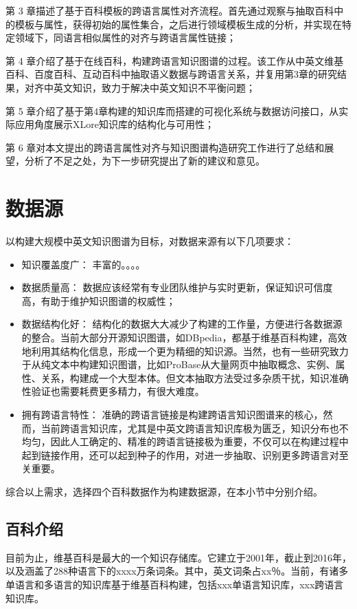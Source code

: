 第 3 章描述了基于百科模板的跨语言属性对齐流程。首先通过观察与抽取百科中的模板与属性，获得初始的属性集合，之后进行领域模板生成的分析，并实现在特定领域下，同语言相似属性的对齐与跨语言属性链接；

第 4 章介绍了基于在线百科，构建跨语言知识图谱的过程。该工作从中英文维基百科、百度百科、互动百科中抽取语义数据与跨语言关系，并复用第3章的研究结果，对齐中英文知识，致力于解决中英文知识不平衡问题；

第 5 章介绍了基于第4章构建的知识库而搭建的可视化系统与数据访问接口，从实际应用角度展示XLore知识库的结构化与可用性；

第 6 章对本文提出的跨语言属性对齐与知识图谱构造研究工作进行了总结和展望，分析了不足之处，为下一步研究提出了新的建议和意见。
 

\section{数据源}
\label{sec3:datasource}

以构建大规模中英文知识图谱为目标，对数据来源有以下几项要求：

\begin{itemize}
\item  {\heiti 知识覆盖度广：} 丰富的。。。。
\item  {\heiti 数据质量高：} 数据应该经常有专业团队维护与实时更新，保证知识可信度高，有助于维护知识图谱的权威性；
\item  {\heiti 数据结构化好：} 结构化的数据大大减少了构建的工作量，方便进行各数据源的整合。当前大部分开源知识图谱，如DBpedia，都基于维基百科构建，高效地利用其结构化信息，形成一个更为精细的知识源。当然，也有一些研究致力于从纯文本中构建知识图谱，比如ProBase从大量网页中抽取概念、实例、属性、关系，构建成一个大型本体。但文本抽取方法受过多杂质干扰，知识准确性验证也需要耗费更多精力，有很大难度。
\item  {\heiti 拥有跨语言特性：} 准确的跨语言链接是构建跨语言知识图谱来的核心，然而，当前跨语言知识库，尤其是中英文跨语言知识库极为匮乏，知识分布也不均匀，因此人工确定的、精准的跨语言链接极为重要，不仅可以在构建过程中起到链接作用，还可以起到种子的作用，对进一步抽取、识别更多跨语言对至关重要。
\end{itemize}
综合以上需求，选择四个百科数据作为构建数据源，在本小节中分别介绍。

\subsection{百科介绍}

目前为止，维基百科是最大的一个知识存储库。它建立于2001年，截止到2016年，以及涵盖了288种语言下的xxxx万条词条。其中，英文词条占xx％。当前，有诸多单语言和多语言的知识库基于维基百科构建，包括xxx单语言知识库，xxx跨语言知识库。


